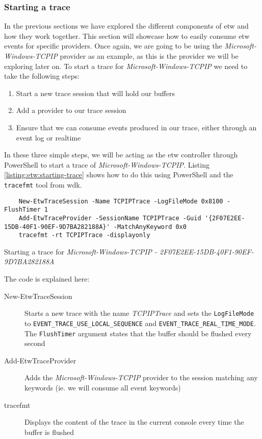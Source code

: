\documentclass{report}
\begin{document}
\subsubsection{Starting a trace}
In the previous sections we have explored the different components of \gls{etw} and how they work together. This section will showcase how to easily consume \gls{etw} events for specific providers. Once again, we are going to be using the \emph{Microsoft-Windows-TCPIP} provider as an example, as this is the provider we will be exploring later on. To start a trace for \emph{Microsoft-Windows-TCPIP} we need to take the following steps:

\begin{enumerate}
    \item Start a new trace session that will hold our buffers
    \item Add a provider to our trace session
    \item Ensure that we can consume events produced in our trace, either through an event log or realtime
\end{enumerate}

In these three simple steps, we will be acting as the \gls{etw} controller through PowerShell to start a trace of \emph{Microsoft-Windows-TCPIP}. Listing \ref{listing:etw:starting-trace} shows how to do this using PowerShell and the \texttt{tracefmt} tool from \gls{wdk}.

\begin{listing}
\begin{verbatim}
    New-EtwTraceSession -Name TCPIPTrace -LogFileMode 0x8100 -FlushTimer 1
    Add-EtwTraceProvider -SessionName TCPIPTrace -Guid '{2F07E2EE-15DB-40F1-90EF-9D7BA282188A}' -MatchAnyKeyword 0x0
    tracefmt -rt TCPIPTrace -displayonly
\end{verbatim}
\caption{Starting a trace for \emph{Microsoft-Windows-TCPIP - 2F07E2EE-15DB-40F1-90EF-9D7BA282188A}}
\label{listing:etw:starting-trace}
\end{listing}

The code is explained here:
\begin{description}
    \item[New-EtwTraceSession] Starts a new trace with the name \emph{TCPIPTrace} and sets the \texttt{LogFileMode} to \texttt{EVENT_TRACE_USE_LOCAL_SEQUENCE} and \texttt{EVENT_TRACE_REAL_TIME_MODE}\cite{url:etw:trace:logging-mode-constants}. The \texttt{FlushTimer} argument states that the buffer should be flushed every second
    \item[Add-EtwTraceProvider] Adds the \emph{Microsoft-Windows-TCPIP} provider to the session matching any keywords (ie. we will consume all event keywords)
    \item[tracefmt] Displays the content of the trace in the current console every time the buffer is flushed
\end{description}
\end{document}

